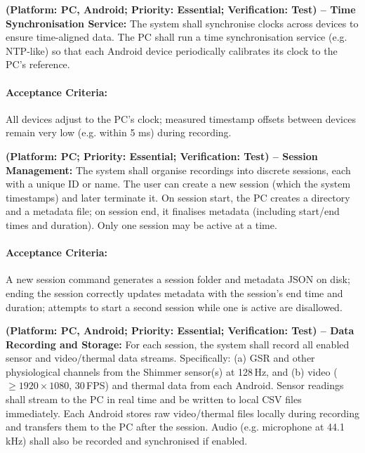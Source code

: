 \begin{description}[style=unboxed,leftmargin=0cm]
    \item[\textbf{FR3}] \textbf{(Platform: PC, Android; Priority: Essential; Verification: Test) – Time Synchronisation Service:} The system shall synchronise clocks across devices to ensure time-aligned data. The PC shall run a time synchronisation service (e.g. NTP-like) so that each Android device periodically calibrates its clock to the PC’s reference.

    \paragraph{Acceptance Criteria:} All devices adjust to the PC’s clock; measured timestamp offsets between devices remain very low (e.g. within 5 ms) during recording.

    \item[\textbf{FR4}] \textbf{(Platform: PC; Priority: Essential; Verification: Test) – Session Management:} The system shall organise recordings into discrete sessions, each with a unique ID or name. The user can create a new session (which the system timestamps) and later terminate it. On session start, the PC creates a directory and a metadata file; on session end, it finalises metadata (including start/end times and duration). Only one session may be active at a time.

    \paragraph{Acceptance Criteria:} A new session command generates a session folder and metadata JSON on disk; ending the session correctly updates metadata with the session’s end time and duration; attempts to start a second session while one is active are disallowed.

    \item[\textbf{FR5}] \textbf{(Platform: PC, Android; Priority: Essential; Verification: Test) – Data Recording and Storage:} For each session, the system shall record all enabled sensor and video/thermal data streams. Specifically: (a) GSR and other physiological channels from the Shimmer sensor(s) at 128\,Hz, and (b) video ($\geq 1920 \times 1080$, 30\,FPS) and thermal data from each Android. Sensor readings shall stream to the PC in real time and be written to local CSV files immediately. Each Android stores raw video/thermal files locally during recording and transfers them to the PC after the session. Audio (e.g. microphone at 44.1\,kHz) shall also be recorded and synchronised if enabled.


\end{description}
